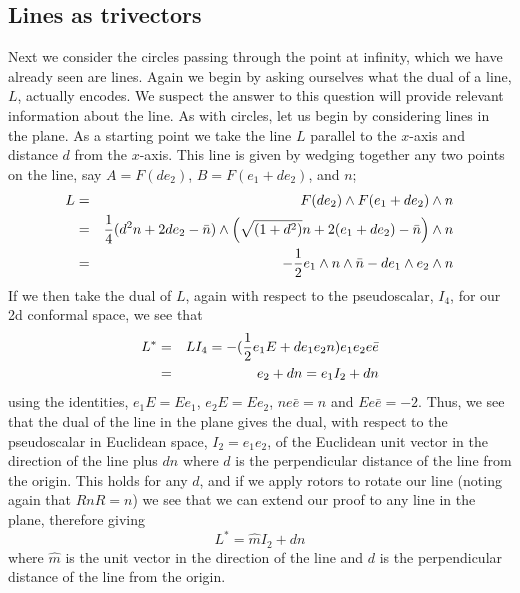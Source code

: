 \subsection{Lines as trivectors}

 Next we consider the circles passing through
the point at infinity, which we have already seen are
lines. Again we begin by asking ourselves what the dual
of a line, $L$, actually encodes. We suspect the answer to
this question will provide relevant information about the line.  
As with circles, let us begin by considering lines in the plane.
As a starting point we take the line $L$ parallel to the $x$-axis and
distance $d$ from the $x$-axis.
%
%
This line is given by wedging together any two points on
the line, say $A = F(de_2)$, $B = F(e_1 + de_2)$, and $n$;
%
\begin{eqnarray}
L & = & F(de_2)\wedge F(e_1 + de_2)\wedge n \nonumber \\
  & = & \frac{1}{4}(d^2n+2de_2-\bar{n})\wedge
  \left(\sqrt{(1+d^2)}n+2(e_1+de_2)-\bar{n}\right)\wedge n \nonumber \\
  & = & -\frac{1}{2} e_1\wedge n\wedge \bar{n} - d e_1\wedge e_2\wedge
  n
\end{eqnarray}
%
If we then take the dual of $L$, again with respect to
the pseudoscalar, $I_4$, for our 2d conformal space, we
see that
%
\begin{eqnarray}
L^* & = & LI_4 = -(\frac{1}{2} e_1E + de_1 e_2n)e_1e_2e\bar{e} \nonumber \\
    & = & e_2 + dn = e_1I_2 + dn
\end{eqnarray}
%
using the identities, $e_1E=Ee_1$, $e_2E=Ee_2$,
$ne\bar{e}=n$ and $Ee\bar{e}=-2$. Thus, we see that the
dual of the line in the plane gives the dual, with
respect to the pseudoscalar in Euclidean space,
$I_2=e_1e_2$, of the Euclidean unit vector in the
direction of the line plus $dn$ where $d$ is the
perpendicular distance of the line from the origin. This
holds for any $d$, and if we apply rotors to rotate our
line (noting again that $RnR=n$) we see that we can
extend our proof to any line in the plane, therefore
giving
%
\begin{equation}
L^* = \hat{m}I_2 + dn
\end{equation}
%
where $\hat{m}$ is the unit vector in the direction of
the line and $d$ is the perpendicular distance of the
line from the origin.

